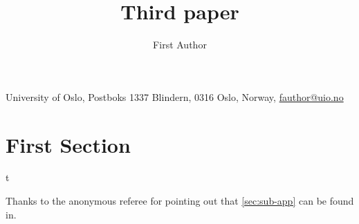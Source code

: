 \documentclass{standalone}
\begin{document}
\author{First Author}
\title{Third paper}
\maketitle
\label{pap:third}
\footnotetext
{%
    University of Oslo,
    Postboks 1337 Blindern, 0316 Oslo, Norway,
    \href{mailto:fauthor@uio.no}{fauthor@uio.no}
}



\section{First Section}t


\begin{acknowledgements}
    Thanks to the anonymous referee for pointing out that \cref{sec:sub-app} can be found in.
\end{acknowledgements}
\end{document}
